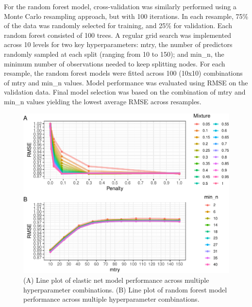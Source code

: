 \documentclass[sn-basic,pdflatex]{sn-jnl}
\begin{document}
For the random forest model, cross-validation was similarly performed
using a Monte Carlo resampling approach, but with 100 iterations. In
each resample, 75\% of the data was randomly selected for training, and
25\% for validation. Each random forest consisted of 100 trees. A
regular grid search was implemented across 10 levels for two key
hyperparameters: mtry, the number of predictors randomly sampled at each
split (ranging from 10 to 150); and min\_n, the minimum number of
observations needed to keep splitting nodes. For each resample, the
random forest models were fitted across 100 (10x10) combinations of mtry
and min\_n values. Model performance was evaluated using RMSE on the
validation data. Final model selection was based on the combination of
mtry and min\_n values yielding the lowest average RMSE across
resamples.

\begin{figure}

{\centering \includegraphics{HWC_final-paper-draft_files/figure-latex/fig_hyperparameter_performance-1} 

}

\caption{(A) Line plot of elastic net model performance across multiple hyperparameter combinations. (B) Line plot of random forest model performance across multiple hyperparameter combinations.}\label{fig:fig_hyperparameter_performance}
\end{figure}
\end{document}
